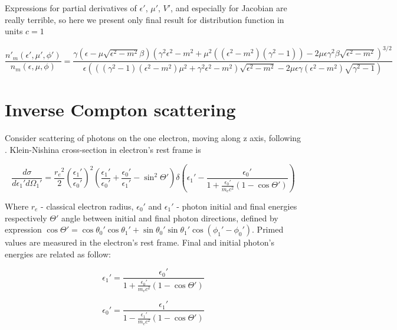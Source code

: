 Expressions for partial derivatives of $\epsilon'$, $\mu'$, $V'$, and especially for Jacobian are really terrible, so here we present only final result for distribution function in units $c = 1$

\begin{equation}
		\frac{n'_{m}(\epsilon',\mu',\phi')}{n_{m}(\epsilon,\mu,\phi)}= \frac{\gamma(\epsilon-\mu\sqrt{{\epsilon}^2-m^2}\beta)(\gamma^2\epsilon^2-m^2 + \mu^2 ((\epsilon^2-m^2)(\gamma^2-1)) - 2\mu\epsilon\gamma^2\beta\sqrt{\epsilon^2-m^2})^{3/2}}{\epsilon(((\gamma^2-1)(\epsilon^2-m^2)\mu^2 + \gamma^2\epsilon^2 - m^2)\sqrt{\epsilon^2-m^2}-2\mu\epsilon\gamma(\epsilon^2 - m^2)\sqrt{\gamma^2 - 1})}
\end{equation}

\section{Inverse Compton scattering}\label{comptonFormulaSection}

Consider scattering of photons on the one electron, moving along z axis, following \cite{Dubus}. Klein-Nishina cross-section in electron's rest frame is

\begin{equation}\label{KleinNishina}
	\frac{d\sigma}{d\epsilon_1'd\Omega_1'}=\frac{{r_e}^2}{2}\left(\frac{\epsilon_1'}{\epsilon_0'}\right)^2\left(\frac{\epsilon_1'}{\epsilon_0'}+\frac{\epsilon_0'}{\epsilon_1'}-\sin^2\Theta'\right) \delta\left(\epsilon_1' - \frac{\epsilon_0'}{1+\frac{\epsilon_0'}{m_e c^2}(1 - \cos \Theta')}\right)
\end{equation}

Where $r_e$ - classical electron radius, $\epsilon_0'$ and $\epsilon_1'$ - photon initial and final energies respectively $\Theta'$ angle between initial and final photon directions, defined by expression $\cos\Theta' =\cos \theta_0' \cos \theta_1' + \sin \theta_0' \sin \theta_1' \cos(\phi_1' - \phi_0')$. Primed values are measured in the electron's rest frame. Final and initial photon's energies are related as follow:

\begin{equation}
	\epsilon_1'=\frac{\epsilon_0'}{1+\frac{\epsilon_0'}{m_e c^2}(1 - \cos \Theta')}	
\end{equation}

\begin{equation}
	\epsilon_0'=\frac{\epsilon_1'}{1-\frac{\epsilon_1'}{m_e c^2}(1 - \cos \Theta')}
\end{equation}


